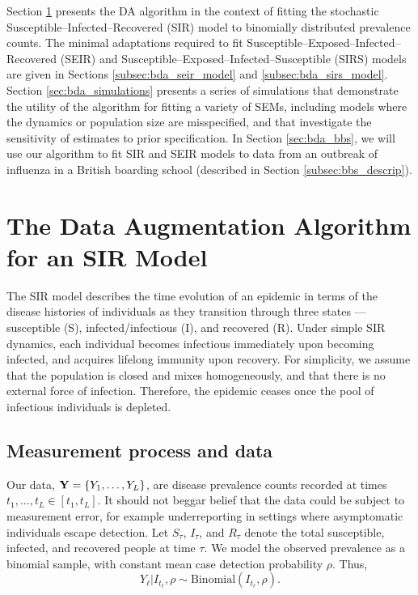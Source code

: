 Section \ref{sec:bda_sir_model} presents the DA algorithm in the context of fitting the stochastic Susceptible--Infected--Recovered (SIR) model to binomially distributed prevalence counts. The minimal adaptations required to fit Susceptible--Exposed--Infected--Recovered (SEIR) and Susceptible--Exposed--Infected--Susceptible (SIRS) models are given in Sections  \ref{subsec:bda_seir_model} and \ref{subsec:bda_sirs_model}. Section \ref{sec:bda_simulations} presents a series of simulations that demonstrate the utility of the algorithm for fitting a variety of SEMs, including models where the dynamics or population size are misspecified, and that investigate the sensitivity of estimates to prior specification. In Section \ref{sec:bda_bbs}, we will use our algorithm to fit SIR and SEIR models to data from an outbreak of influenza in a British boarding school (described in Section \ref{subsec:bbs_descrip}).

\section{The Data Augmentation Algorithm for an SIR Model}
\label{sec:bda_sir_model}

The SIR model describes the time evolution of an epidemic in terms of the disease histories of individuals as they transition through three states --- susceptible (S), infected/infectious (I), and recovered (R). Under simple SIR dynamics, each individual becomes infectious immediately upon becoming infected, and acquires lifelong immunity upon recovery. For simplicity, we assume that the population is closed and mixes homogeneously, and that there is no external force of infection. Therefore, the epidemic ceases once the pool of infectious individuals is depleted.

\subsection{Measurement process and data}
\label{subsec:bda_meas_proc}
Our data, $\mathbf{Y} = \lbrace Y_{1}, \dots, Y_L \rbrace$, are disease prevalence counts recorded at times $t_1,\dots,t_L \in [t_1,t_L]$. It should not beggar belief that the data could be subject to measurement error, for example underreporting in settings where asymptomatic individuals escape detection. Let $ S_\tau $, $ I_\tau $, and $ R_\tau $ denote the total susceptible, infected, and recovered people at time $ \tau $. We model the observed prevalence as a binomial sample, with constant mean case detection probability $ \rho $. Thus,
\begin{equation}\label{eqn:bda_emit_dist}
Y_\ell | I_{t_\ell},\rho \sim \mathrm{Binomial}\left (I_{t_\ell}, \rho\right ).\end{equation}


